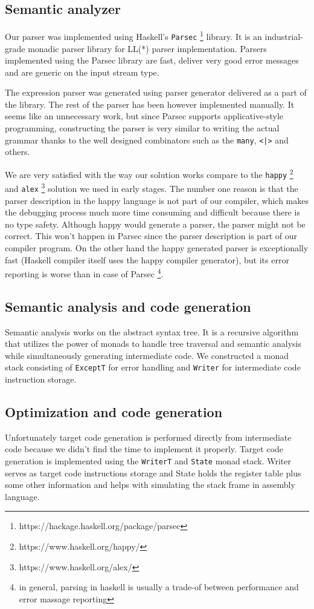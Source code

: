 \documentclass[titlepage]{article}
\begin{document}
\subsection{Semantic analyzer}
Our parser was implemented using Haskell's \texttt{Parsec}
\footnote{https://hackage.haskell.org/package/parsec} library. It is
an industrial-grade monadic parser library for LL(*) parser implementation. Parsers
implemented using the Parsec library are fast, deliver very good error messages and
are generic on the input stream type.

The expression parser was generated using parser generator delivered as a part of the
library. The rest of the parser has been however implemented manually. It seems like an
unnecessary work, but since Parsec supports applicative-style programming,
constructing the parser is very similar to writing the actual grammar thanks to the well
designed combinators such as the \texttt{many}, \texttt{<|>} and others.

We are very satisfied with the way our solution works compare to the \texttt{happy}
\footnote{https://www.haskell.org/happy/} \cite{happy} and \texttt{alex}
\footnote{https://www.haskell.org/alex/} solution we used in early stages. The number one
reason is that the parser description in the happy language is not part of our
compiler, which makes the debugging process much more time consuming and difficult
because there is no type safety. Although happy would generate a parser, the parser
might not be correct. This won't happen in Parsec since the parser description is
part of our compiler program.
On the other hand the happy generated parser is exceptionally fast (Haskell compiler
itself uses the happy compiler generator), but its error reporting is worse than in
case of Parsec \footnote{in general, parsing in haskell is usually a trade-of between performance
and error massage reporting}.

\subsection{Semantic analysis and code generation}
Semantic analysis works on the abstract syntax tree. It is a recursive algorithm that
utilizes the power of monads to handle tree traversal and semantic analysis while
simultaneously generating intermediate code. We constructed a monad stack consisting of
\texttt{ExceptT} for error handling and \texttt{Writer} for intermediate code instruction
storage.

\subsection{Optimization and code generation}
Unfortunately target code generation is performed directly from intermediate code because
we didn't find the time to implement it properly. Target code generation is implemented
using the \texttt{WriterT} and \texttt{State} monad stack. Writer serves as target code
instructions storage and State holds the register table plus some other information and
helps with simulating the stack frame in assembly language.
\end{document}
